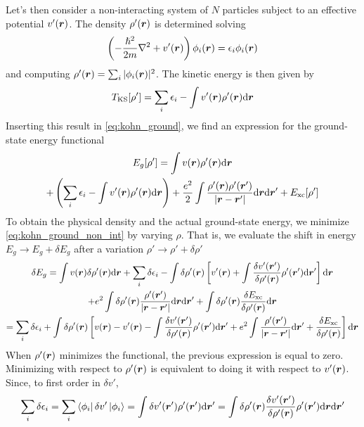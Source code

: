 Let's then consider a non-interacting system of $N$ particles subject to an effective potential $v'(\mathbf{\boldsymbol{r}})$. The density $\rho'(\mathbf{\boldsymbol{r}})$ is determined solving
\begin{equation}
    \left(-\frac{\hslash^2}{2m} \laplacian + \rr{v'} \right) \rr{\phi_i} = \epsilon_i \rr{\phi_i}
\end{equation}
and computing $\rho'(\mathbf{\boldsymbol{r}}) = \sum_i |\phi_i(\mathbf{\boldsymbol{r}})|^2$. The kinetic energy is then given by
\begin{equation}
    T_\text{KS}[\rho'] = \sum_i \epsilon_i - \int \rr{v'} \rr{\rho'} \dr
\end{equation}
Inserting this result in \cref{eq:kohn_ground}, we find an expression for the ground-state energy functional
\begin{multline} \label{eq:kohn_ground_non_int}
    E_g[\rho'] = \int \rr{v} \rr{\rho'} \dr
    \\+ \left(\sum_i \epsilon_i - \int \rr{v'} \rr{\rho'} \dr\right) + \frac{e^2}{2} \int \frac{\rho'(\vec{r})\rho'(\vec{r}')}{|\vec{r}-\vec{r}'|}  \dr \dr' + E_\text{xc}[\rho']
\end{multline}
To obtain the physical density and the actual ground-state energy, we minimize \cref{eq:kohn_ground_non_int} by varying $\rho$. That is, we evaluate the shift in energy $E_g \rightarrow E_g + \delta E_g$ after a variation $\rho' \rightarrow \rho' + \delta\rho'$
\begin{multline} \label{eq:kohn_ground_variation}
    \delta E_g =
    \int \rr{v} \delta\rr{\rho'} \dr
    + \sum_i \delta \epsilon_i
    - \int \delta \rr{\rho'} \left[ \rr{v'} + \int \frac{\delta v'(\vec{r}')}{\delta\rr{\rho'}}\rho'(\vec{r}') \dr' \right] \dr
    \\+ e^2 \int \delta\rr{\rho'} \frac{\rho'(\vec{r}')}{|\vec{r}-\vec{r}'|}  \dr \dr'
    + \int \delta\rr{\rho'} \frac{\delta E_\text{xc}}{\delta\rr{\rho'}} \dr
    \\ = \sum_i \delta \epsilon_i + \int \delta\rr{\rho'} \left[ \rr{v} - \rr{v'} - \int \frac{\delta v'(\vec{r}')}{\delta\rr{\rho'}}\rho'(\vec{r}') \dr' + e^2 \int \frac{\rho'(\vec{r}')}{|\vec{r}-\vec{r}'|} \dr' + \frac{\delta E_\text{xc}}{\delta\rr{\rho'}} \right] \dr
\end{multline}
When $\rho'(\mathbf{\boldsymbol{r}})$ minimizes the functional, the previous expression is equal to zero. Minimizing with respect to $\rho'(\mathbf{\boldsymbol{r}})$ is equivalent to doing it with respect to $v'(\mathbf{\boldsymbol{r}})$. Since, to first order in $\delta v'$,
\begin{equation}
    \sum_i \delta \epsilon_i = \sum_i \bra{\phi_i} \delta v' \ket{\phi_i}
    = \int \rrp{\delta v'} \rrp{\rho'} \dr'
    = \int \delta \rr{\rho'} \frac{\delta v'(\vec{r}')}{\delta \rr{\rho'}} \rrp{\rho'} \dr \dr'
\end{equation}
